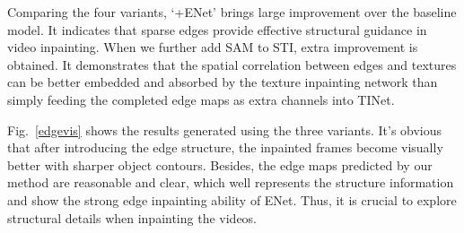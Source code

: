 
Comparing the four variants, `+ENet' brings large improvement over the baseline model.
It indicates that sparse edges provide effective structural guidance in video inpainting.
When we further add SAM to STI, extra improvement is obtained. 
It demonstrates that the spatial correlation between  edges and textures can be better embedded and absorbed by the texture inpainting network than simply feeding the completed edge maps as extra channels into TINet.


Fig.~\ref{edgevis} shows the results generated using the three variants. 
It's obvious that after introducing the edge structure, the inpainted frames become visually better with sharper object contours. 
Besides, the edge maps predicted by our method are reasonable and clear, which well represents the structure information and show the strong edge inpainting ability of ENet. Thus, it is crucial to explore structural details when inpainting the videos.




